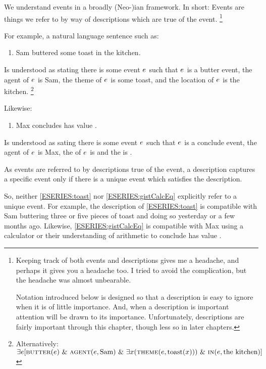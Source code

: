 \begin{note}
  We understand events in a broadly (Neo-)\citeauthor{Davidson:1967aa}ian framework.
  In short:
  Events are things we refer to by way of descriptions which are true of the event.%
  \footnote{
    Keeping track of both events and descriptions gives me a headache, and perhaps it gives you a headache too.
    I tried to avoid the complication, but the headache was almost unbearable.

    Notation introduced below is designed so that a description is easy to ignore when it is of little importance.
    And, when a description is important attention will be drawn to its importance.
    Unfortunately, descriptions are fairly important through this chapter, though less so in later chapters.
  }

  For example, a natural language sentence such as:
  \begin{enumerate}[label=\arabic*., ref=(\arabic*), series=ESERIES]
  \item
    \label{ESERIES:toast}
    Sam buttered some toast in the kitchen.
  \end{enumerate}
  Is understood as stating there is some event \(e\sb{}\) such that \(e\sb{}\) is a butter event, the agent of \(e\sb{}\) is Sam, the theme of \(e\sb{}\) is some toast, and the location of \(e\sb{}\) is the kitchen.%
  \footnote{
    Alternatively:
    \(\exists e [\textsc{butter}(e)\text{ \& }\textsc{agent}(e, \text{Sam})\text{ \& }\exists x(\textsc{theme}(e, \text{toast}(x)))\text{ \& }\textsc{in}(e, \text{the kitchen})]\)
  }

  Likewise:
  \begin{enumerate}[label=\arabic*., ref=(\arabic*), resume*=ESERIES]
  \item
    \label{ESERIES:gistCalcEq}
    Max concludes \gistCalcEq{} has value .
  \end{enumerate}
  Is understood as sating there is some event \(e\sb{}\) such that \(e\sb{}\) is a conclude event, the agent of \(e\sb{}\) is Max, the  of \(e\sb{}\) is \gistCalcEq{} and the \val{} is .

  As events are referred to by descriptions true of the event, a description captures a specific event only if there is a unique event which satisfies the description.

  So, neither \ref{ESERIES:toast} nor \ref{ESERIES:gistCalcEq} explicitly refer to a unique event.
  For example, the description of \ref{ESERIES:toast} is compatible with Sam buttering three or five pieces of toast and doing so yesterday or a few months ago.
  Likewise, \ref{ESERIES:gistCalcEq} is compatible with Max using a calculator or their understanding of arithmetic to conclude \gistCalcEq{} has value .


\end{note}
